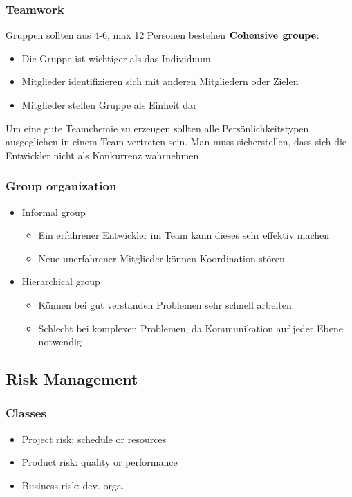 \subsubsection{Teamwork}
Gruppen sollten aus 4-6, max 12 Personen bestehen \newline
$\bold{Cohensive}$ $\bold{groupe}$:
\begin{itemize}
	\item Die Gruppe ist wichtiger als das Individuum
	\item Mitglieder identifizieren sich mit anderen Mitgliedern oder Zielen
	\item Mitglieder stellen Gruppe als Einheit dar
\end{itemize}
Um eine gute Teamchemie zu erzeugen sollten alle Persönlichkeitstypen ausgeglichen in einem Team vertreten sein. Man muss sicherstellen, dass sich die Entwickler nicht als Konkurrenz wahrnehmen
\subsubsection{Group organization}
\begin{itemize}
	\item Informal group
		\begin{itemize}
			\item Ein erfahrener Entwickler im Team kann dieses sehr effektiv machen
			\item Neue unerfahrener Mitglieder können Koordination stören
		\end{itemize}
	\item Hierarchical group
		\begin{itemize}
			\item Können bei gut verstanden Problemen sehr schnell arbeiten
			\item Schlecht bei komplexen Problemen, da Kommunikation auf jeder Ebene notwendig
		\end{itemize}
\end{itemize} 
\subsection{Risk Management}
\subsubsection{Classes}
\begin{itemize}
	\item Project risk: schedule or resources
	\item Product risk: quality or performance
	\item Business risk: dev. orga. 
\end{itemize}
